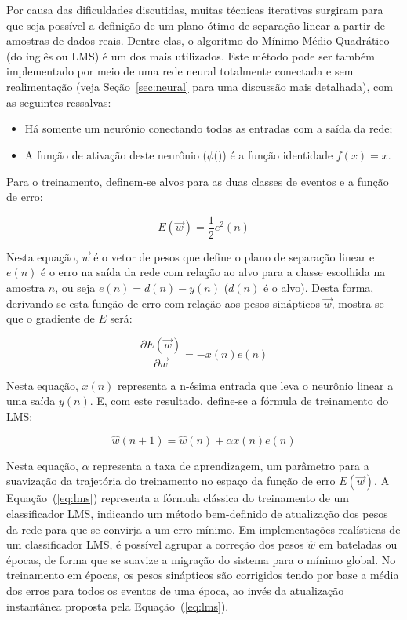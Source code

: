 Por causa das dificuldades discutidas, muitas técnicas iterativas surgiram
para que seja possível a definição de um plano ótimo de separação linear a
partir de amostras de dados reais. Dentre elas, o algoritmo do Mínimo Médio
Quadrático \cite{widrow} (do inglês  ou LMS) é um dos
mais utilizados. Este método pode ser também implementado por meio de uma rede
neural totalmente conectada e sem realimentação (veja Seção~\ref{sec:neural}
para uma discussão mais detalhada), com as seguintes ressalvas:

\begin{itemize}
\item Há somente um neurônio conectando todas as entradas com a saída da rede;
\item A função de ativação deste neurônio ($\phi(\dot)$) é a função identidade
$f(x) = x$.
\end{itemize}

Para o treinamento, definem-se alvos para as duas classes de eventos e a
função de erro:

\begin{equation}
E(\overrightarrow{w}) = \frac{1}{2} e^2(n)
\label{eq:mse-definition}
\end{equation}

Nesta equação, $\overrightarrow{w}$ é o vetor de pesos que define o plano de
separação linear e $e(n)$ é o erro na saída da rede com relação ao alvo para a
classe escolhida na amostra $n$, ou seja $e(n) = d(n)-y(n)$ ($d(n)$ é o
alvo). Desta forma, derivando-se esta função de erro com relação aos pesos
sinápticos $\overrightarrow{w}$, mostra-se que o gradiente de $E$ será:

\begin{equation}
\frac{\partial E(\overrightarrow{w})}{\partial \overrightarrow{w}} =
-x(n)e(n) 
\end{equation}

Nesta equação, $x(n)$ representa a n-ésima entrada que leva o neurônio linear
a uma saída $y(n)$. E, com este resultado, define-se a fórmula de treinamento
do LMS:

\begin{equation}
\hat{w}(n+1) = \hat{w}(n) + \alpha x(n)e(n)
\label{eq:lms}
\end{equation}

Nesta equação, $\alpha$ representa a taxa de aprendizagem, um parâmetro para a
suavização da trajetória do treinamento no espaço da função de erro
$E(\overrightarrow{w})$. A Equação~(\ref{eq:lms}) representa a fórmula
clássica do treinamento de um classificador LMS, indicando um método
bem-definido de atualização dos pesos da rede para que se convirja a um erro
mínimo. Em implementações realísticas de um classificador LMS, é possível
agrupar a correção dos pesos $\hat{w}$ em bateladas ou épocas, de forma que se
suavize a migração do sistema para o mínimo global. No treinamento em épocas,
os pesos sinápticos são corrigidos tendo por base a média dos erros para todos
os eventos de uma época, ao invés da atualização instantânea proposta pela
Equação~(\ref{eq:lms}).

